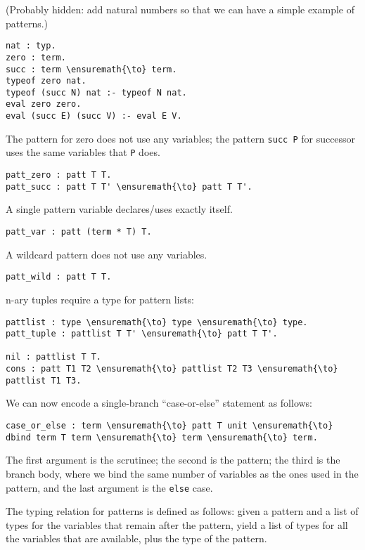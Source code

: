 (Probably hidden: add natural numbers so that we can have a simple
example of patterns.)

\begin{verbatim}
nat : typ.
zero : term.
succ : term \ensuremath{\to} term.
typeof zero nat.
typeof (succ N) nat :- typeof N nat.
eval zero zero.
eval (succ E) (succ V) :- eval E V.
\end{verbatim}

The pattern for zero does not use any variables; the pattern
\texttt{succ\ P} for successor uses the same variables that \texttt{P}
does.

\begin{verbatim}
patt_zero : patt T T.
patt_succ : patt T T' \ensuremath{\to} patt T T'.
\end{verbatim}

A single pattern variable declares/uses exactly itself.

\begin{verbatim}
patt_var : patt (term * T) T.
\end{verbatim}

A wildcard pattern does not use any variables.

\begin{verbatim}
patt_wild : patt T T.
\end{verbatim}

n-ary tuples require a type for pattern lists:

\begin{verbatim}
pattlist : type \ensuremath{\to} type \ensuremath{\to} type.
patt_tuple : pattlist T T' \ensuremath{\to} patt T T'.

nil : pattlist T T.
cons : patt T1 T2 \ensuremath{\to} pattlist T2 T3 \ensuremath{\to} pattlist T1 T3.
\end{verbatim}

We can now encode a single-branch ``case-or-else'' statement as follows:

\begin{verbatim}
case_or_else : term \ensuremath{\to} patt T unit \ensuremath{\to} dbind term T term \ensuremath{\to} term \ensuremath{\to} term.
\end{verbatim}

The first argument is the scrutinee; the second is the pattern; the
third is the branch body, where we bind the same number of variables as
the ones used in the pattern, and the last argument is the \texttt{else}
case.

The typing relation for patterns is defined as follows: given a pattern
and a list of types for the variables that remain after the pattern,
yield a list of types for all the variables that are available, plus the
type of the pattern.

